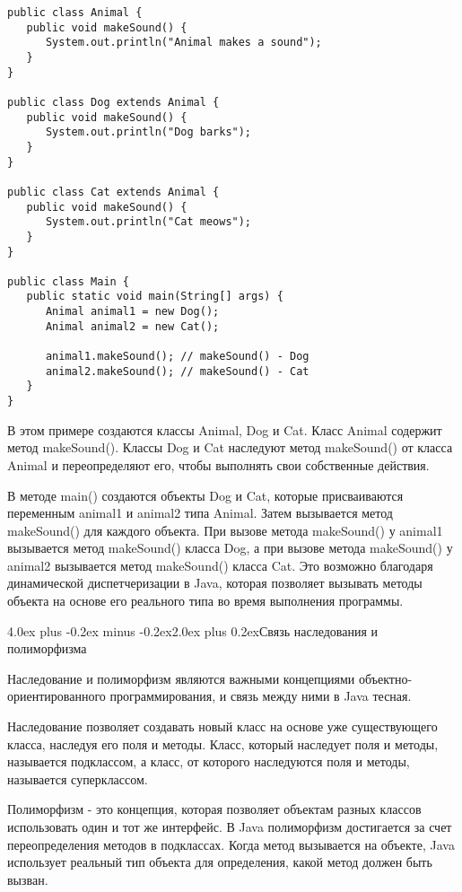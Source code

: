 \documentclass[12pt, a4paper]{book}%
\makeatletter
\renewcommand{\section}{\@startsection{section}{1}{1pt}%
{4.0ex plus -0.2ex minus -0.2ex}{2.0ex plus 0.2ex}{\centering\bf}}%
\makeatother
\begin{document}
{\begin{lstlisting}
public class Animal {
   public void makeSound() {
      System.out.println("Animal makes a sound");
   }
}

public class Dog extends Animal {
   public void makeSound() {
      System.out.println("Dog barks");
   }
}

public class Cat extends Animal {
   public void makeSound() {
      System.out.println("Cat meows");
   }
}

public class Main {
   public static void main(String[] args) {
      Animal animal1 = new Dog();
      Animal animal2 = new Cat();

      animal1.makeSound(); // makeSound() - Dog
      animal2.makeSound(); // makeSound() - Cat
   }
}
\end{lstlisting}

В этом примере создаются классы Animal, Dog и Cat. Класс Animal содержит метод makeSound(). Классы Dog и Cat наследуют метод makeSound() от класса Animal и переопределяют его, чтобы выполнять свои собственные действия.

В методе main() создаются объекты Dog и Cat, которые присваиваются переменным animal1 и animal2 типа Animal. Затем вызывается метод makeSound() для каждого объекта. При вызове метода makeSound() у animal1 вызывается метод makeSound() класса Dog, а при вызове метода makeSound() у animal2 вызывается метод makeSound() класса Cat. Это возможно благодаря динамической диспетчеризации в Java, которая позволяет вызывать методы объекта на основе его реального типа во время выполнения программы.


\section{Связь наследования и полиморфизма}

Наследование и полиморфизм являются важными концепциями объектно-ориентированного программирования, и связь между ними в Java тесная.

Наследование позволяет создавать новый класс на основе уже существующего класса, наследуя его поля и методы. Класс, который наследует поля и методы, называется подклассом, а класс, от которого наследуются поля и методы, называется суперклассом.

Полиморфизм - это концепция, которая позволяет объектам разных классов использовать один и тот же интерфейс. В Java полиморфизм достигается за счет переопределения методов в подклассах. Когда метод вызывается на объекте, Java использует реальный тип объекта для определения, какой метод должен быть вызван.

}
\end{document}
